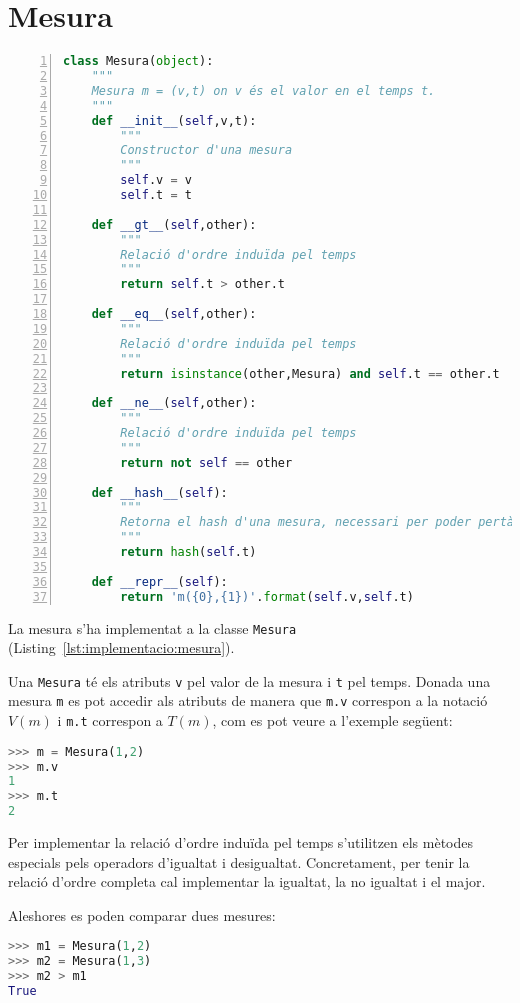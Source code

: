 \section{Mesura}

\begin{lstlisting}[float,language=Python,caption=Implementació de la classe Mesura,label=lst:implementacio:mesura,numbers=left]
class Mesura(object):
    """
    Mesura m = (v,t) on v és el valor en el temps t. 
    """
    def __init__(self,v,t):
        """
        Constructor d'una mesura
        """        
        self.v = v
        self.t = t

    def __gt__(self,other):
        """
        Relació d'ordre induïda pel temps
        """
        return self.t > other.t 
    
    def __eq__(self,other):        
        """
        Relació d'ordre induïda pel temps
        """
        return isinstance(other,Mesura) and self.t == other.t

    def __ne__(self,other):
        """
        Relació d'ordre induïda pel temps
        """
        return not self == other

    def __hash__(self):
        """
        Retorna el hash d'una mesura, necessari per poder pertànyer a objectes col·leccions com per exemple els sets
        """
        return hash(self.t)
    
    def __repr__(self):
        return 'm({0},{1})'.format(self.v,self.t)

\end{lstlisting}

La mesura s'ha implementat a la classe \verb+Mesura+ (Listing~\ref{lst:implementacio:mesura}). 

Una \verb+Mesura+  té els atributs \verb+v+ pel valor de la mesura i \verb+t+ pel temps. Donada una mesura \verb+m+ es pot accedir als atributs de manera que \verb+m.v+ correspon a la notació  $V(m)$ i \verb+m.t+ correspon a $T(m)$, com es pot veure a l'exemple següent:
\begin{lstlisting}[language=Python]
>>> m = Mesura(1,2)
>>> m.v
1
>>> m.t
2
\end{lstlisting}



Per implementar la relació d'ordre induïda pel temps s'utilitzen els mètodes especials  pels operadors d'igualtat i desigualtat. Concretament, per tenir la relació d'ordre completa cal implementar la igualtat, la no igualtat i el major.

Aleshores es poden comparar dues mesures:
\begin{lstlisting}[language=Python]
>>> m1 = Mesura(1,2)
>>> m2 = Mesura(1,3)
>>> m2 > m1
True
\end{lstlisting}




